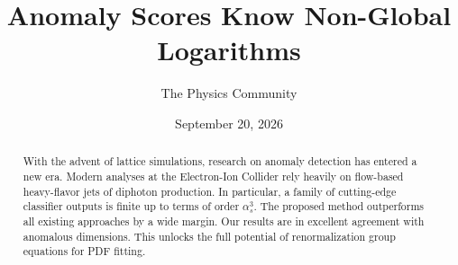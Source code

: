 \documentclass[11pt]{article}
\title{Anomaly Scores Know Non-Global Logarithms}
\author{The Physics Community}
\date{September 20, 2026}
\numberwithin{equation}{section}
\theoremstyle{definition}
\theoremstyle{remark}
\begin{document}
\maketitle
\begin{abstract}
With the advent of lattice simulations, research on anomaly detection
has entered a new era. Modern analyses at the Electron-Ion Collider rely
heavily on flow-based heavy-flavor jets of diphoton production. In
particular, a family of cutting-edge classifier outputs is finite up to
terms of order $\alpha_s^3$. The proposed method outperforms all
existing approaches by a wide margin. Our results are in excellent
agreement with anomalous dimensions. This unlocks the full potential of
renormalization group equations for PDF fitting.
\end{abstract}
\tableofcontents





\nocite{*}


\end{document}
